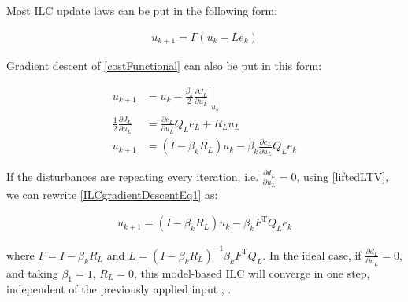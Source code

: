 \documentclass[10pt,a4paper]{article}
\newcommand\at[2]{\left.#1\right|_{#2}} %
\newcommand{\todo}{\textcolor{red}{TODO}} %
\newcommand{\error}{e} %
\newcommand{\linDist}{d} %
\newcommand{\sysInput}{u} %
\newcommand{\qmatrix}{\Gamma} %
\newcommand{\lmatrix}{L} %
\newcommand{\ValueFunction}{J}
\begin{document}
Most ILC update laws can be put in the following form:

\begin{equation}
\begin{aligned}
\sysInput_{k+1} = \qmatrix(\sysInput_{k} - \lmatrix\error_{k})
\end{aligned}
\label{ILCupdateForm}
\end{equation}

Gradient descent of \eqref{costFunctional} can also be put in this form:

\begin{equation}
\begin{aligned}
\sysInput_{k+1} &= \sysInput_k - \frac{\beta_k}{2} \at{\frac{\partial{\ValueFunction_L}}{\partial{\sysInput_L}}}{\sysInput_k} \\
\frac{1}{2}\frac{\partial{\ValueFunction_L}}{\partial{\sysInput_L}} &= \frac{\partial{\error_L}}{\partial{\sysInput_L}}Q_L\error_L + R_L\sysInput_L \\
\sysInput_{k+1} &= (I - \beta_kR_L)\sysInput_k - \beta_k\frac{\partial{\error_L}}{\partial{\sysInput_L}}Q_L\error_k
\end{aligned}
\label{ILCgradientDescentEq1}
\end{equation}

If the disturbances are repeating every iteration, i.e. $\frac{\partial{\linDist_L}}{\partial{\sysInput_L}} = 0$, using \eqref{liftedLTV}, we can rewrite \eqref{ILCgradientDescentEq1} as:

\begin{equation}
\begin{aligned}
\sysInput_{k+1} = (I - \beta_kR_L)\sysInput_k - \beta_kF^\mathrm{T}Q_L\error_k
\end{aligned}
\label{ILCgradientDescentEq2}
\end{equation}

where $\qmatrix = I - \beta_kR_L$ and $\lmatrix = (I - \beta_kR_L)^{-1}\beta_kF^\mathrm{T}Q_L$. In the ideal case, if $\frac{\partial{\linDist_L}}{\partial{\sysInput_L}} = 0$, and taking $\beta_1 = 1$, $R_L = 0$, this model-based ILC will converge in one step, independent of the previously applied input \cite{Bristow06}, \cite{Longman2000}.

\end{document}
